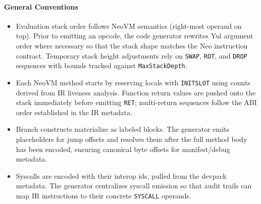 \documentclass[11pt]{article}
\begin{document}
\paragraph{General Conventions}
\begin{itemize}
    \item Evaluation stack order follows NeoVM semantics (right-most operand on top). Prior to emitting an opcode, the code generator rewrites Yul argument order where necessary so that the stack shape matches the Neo instruction contract. Temporary stack height adjustments rely on \texttt{SWAP}, \texttt{ROT}, and \texttt{DROP} sequences with bounds tracked against \texttt{MaxStackDepth}.
    \item Each NeoVM method starts by reserving locals with \texttt{INITSLOT} using counts derived from IR liveness analysis. Function return values are pushed onto the stack immediately before emitting \texttt{RET}; multi-return sequences follow the ABI order established in the IR metadata.
    \item Branch constructs materialize as labeled blocks. The generator emits placeholders for jump offsets and resolves them after the full method body has been encoded, ensuring canonical byte offsets for manifest/debug metadata.
    \item Syscalls are encoded with their interop ids, pulled from the devpack metadata. The generator centralizes syscall emission so that audit trails can map IR instructions to their concrete \texttt{SYSCALL} operands.
\end{itemize}
\end{document}
